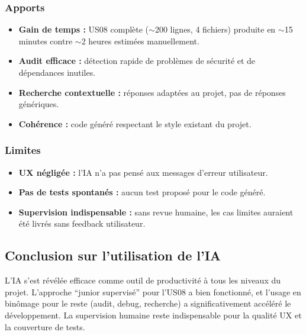 \documentclass[12pt,a4paper]{article}
\begin{document}
\subsubsection{Apports}

\begin{itemize}[nosep]
  \item \textbf{Gain de temps :} US08 compl\`ete ($\sim$200 lignes, 4 fichiers) produite en $\sim$15 minutes contre $\sim$2 heures estim\'ees manuellement.
  \item \textbf{Audit efficace :} d\'etection rapide de probl\`emes de s\'ecurit\'e et de d\'ependances inutiles.
  \item \textbf{Recherche contextuelle :} r\'eponses adapt\'ees au projet, pas de r\'eponses g\'en\'eriques.
  \item \textbf{Coh\'erence :} code g\'en\'er\'e respectant le style existant du projet.
\end{itemize}

\subsubsection{Limites}

\begin{itemize}[nosep]
  \item \textbf{UX n\'eglig\'ee :} l'IA n'a pas pens\'e aux messages d'erreur utilisateur.
  \item \textbf{Pas de tests spontan\'es :} aucun test propos\'e pour le code g\'en\'er\'e.
  \item \textbf{Supervision indispensable :} sans revue humaine, les cas limites auraient \'et\'e livr\'es sans feedback utilisateur.
\end{itemize}

\subsection{Conclusion sur l'utilisation de l'IA}

L'IA s'est r\'ev\'el\'ee efficace comme outil de productivit\'e \`a tous les niveaux du projet. L'approche ``junior supervis\'e'' pour l'US08 a bien fonctionn\'e, et l'usage en bin\^omage pour le reste (audit, debug, recherche) a significativement acc\'el\'er\'e le d\'eveloppement. La supervision humaine reste indispensable pour la qualit\'e UX et la couverture de tests.
\end{document}
